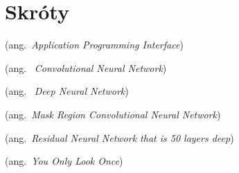 \chapter*{Skróty}\mbox{}
\label{sec:skroty}
\noindent
\begin{description}[labelwidth=*]
  \item [API] (ang.\ \emph{Application Programming Interface})
  \item [CNN] (ang. \ \emph{Convolutional Neural Network})
  \item [DNN] (ang. \ \emph{Deep Neural Network})
  \item [Mask RCNN] (ang.\ \emph{Mask Region Convolutional Neural Network})
  \item [ResNet-50] (ang.\ \emph{Residual Neural Network that is 50 layers deep})
  \item [YOLO] (ang.\ \emph{You Only Look Once})
\end{description}
